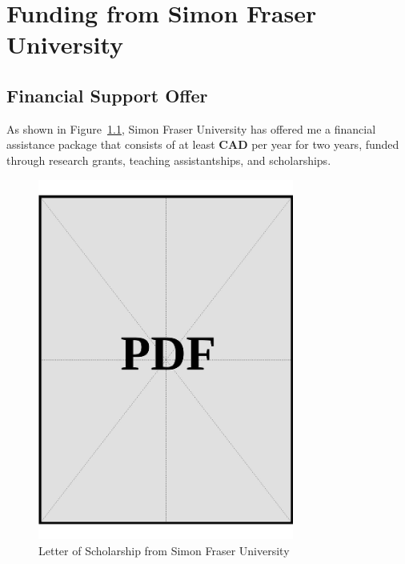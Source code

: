 \chapter{Funding from Simon Fraser University}
\label{sec:university-funding-sources}

\section{Financial Support Offer}\label{sec:university-funding-letter}

As shown in Figure~\ref{fig:scholarship-letter}, Simon Fraser University has offered me a financial assistance package that consists of at least \textbf{CAD \universityFunds} per year for two years, funded through research grants, teaching assistantships, and scholarships.

\vspace*{\fill}
\begin{figure}[h]
    \centering
    \includegraphics[page=1,width=0.75\textwidth]{../application-docs/applicant/canadian-institution/letter-of-scholarship.pdf}
    \caption{Letter of Scholarship from Simon Fraser University}
    \label{fig:scholarship-letter}
\end{figure}
\vspace*{\fill}

